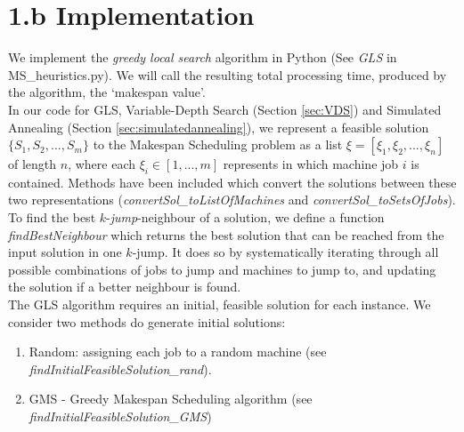 \documentclass[12pt,a4paper,reqno]{article}
\begin{document}

\section*{1.b Implementation} \label{sec:implementation}
We implement the \textit{greedy local search} algorithm in Python (See \emph{GLS} in MS\_heuristics.py). We will call the resulting total processing time, produced by the algorithm, the `makespan value'. \\

In our code for GLS, Variable-Depth Search (Section \ref{sec:VDS}) and Simulated Annealing (Section \ref{sec:simulatedannealing}), we represent a feasible solution $\{S_1,S_2,...,S_m\}$ to the Makespan Scheduling problem as a list $\xi = [\xi_1,\xi_2,...,\xi_n]$ of length $n$, where each $\xi_i \in [1,...,m]$ represents in which machine job $i$ is contained. Methods have been included which convert the solutions between these two representations (\textit{convertSol\_toListOfMachines} and \textit{convertSol\_toSetsOfJobs}). \\

To find the best $k$-\emph{jump}-neighbour of a solution, we define a function \emph{findBestNeighbour} which returns the best solution that can be reached from the input solution in one $k$-jump. It does so by systematically iterating through all possible combinations of jobs to jump and machines to jump to, and updating the solution if a better neighbour is found.\\

The GLS algorithm requires an initial, feasible solution for each instance. We consider two methods do generate initial solutions:
\begin{enumerate}
\item Random: assigning each job to a random machine (see \emph{findInitialFeasibleSolution\_rand}).
\item GMS - Greedy Makespan Scheduling algorithm (see \emph{findInitialFeasibleSolution\_GMS})
\end{enumerate}
\end{document}
